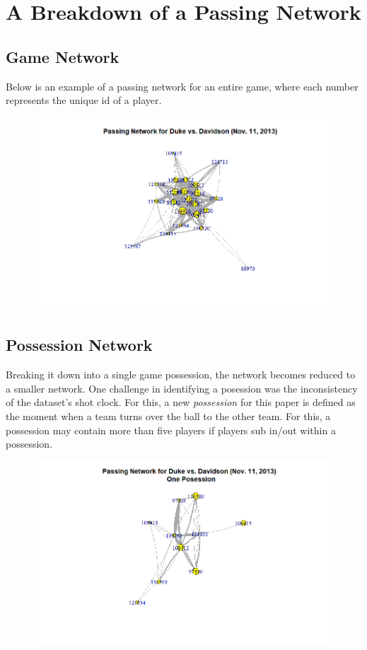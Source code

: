 \documentclass[12pt,twoside]{dukestatscithesis}
\theoremstyle{definition}
\theoremstyle{definition}
\theoremstyle{definition}
\theoremstyle{remark}
\begin{document}
\section{A Breakdown of a Passing
Network}\label{a-breakdown-of-a-passing-network}

\subsection{Game Network}\label{game-network}

Below is an example of a passing network for an entire game, where each
number represents the unique id of a player.
\begin{figure}
\centering
\includegraphics{img/gamenetwork_ex.png}
\caption{}
\end{figure}
\subsection{Possession Network}\label{possession-network}

Breaking it down into a single game possession, the network becomes
reduced to a smaller network. One challenge in identifying a posession
was the inconsistency of the dataset's shot clock. For this, a new
\emph{possession} for this paper is defined as the moment when a team
turns over the ball to the other team. For this, a possession may
contain more than five players if players sub in/out within a
possession.
\begin{figure}
\centering
\includegraphics{img/possessionnetwork_ex.png}
\caption{}
\end{figure}
\end{document}
